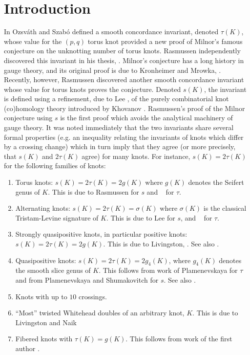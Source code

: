 \maketitle
\section{Introduction}





In \cite{FourBall} Ozsv{\'a}th and Szab{\'o} defined a smooth concordance invariant, denoted $\tau(K)$, whose value for the $(p,q)$ torus knot provided a new proof of Milnor's famous conjecture on the unknotting number of torus knots. Rasmussen independently discovered this invariant in his thesis, \cite{Ras1}. Milnor's conjecture has a long history in gauge theory, and its original proof is due to Kronheimer and Mrowka, \cite{KM}.  Recently, however, Rasmussen \cite{Ras2} discovered another smooth concordance invariant whose value for torus knots proves the conjecture.   Denoted $s(K)$, the invariant is defined using a refinement, due to Lee \cite{Lee}, of the purely combinatorial knot (co)homology  theory introduced by Khovanov \cite{Khovanov}.  Rasmussen's proof of the Milnor conjecture using $s$ is the first proof which avoids the analytical machinery of gauge theory.  It was noted immediately that the two invariants share several formal properties (e.g. an inequality relating the invariants of knots which differ by a crossing change) which in turn imply that they agree (or more precisely, that $s(K)$ and $2\tau(K)$ agree) for many knots.  For instance, $s(K)=2\tau(K)$ for the following families of knots:

\begin{enumerate}
	\item Torus knots:  $s(K)=2\tau(K)=2g(K)$ where $g(K)$ denotes the Seifert genus of $K$. This is due to Rasmussen \cite{Ras2}  for $s$ and \ons \ \cite{Lens} for $\tau$.  
	\item Alternating knots: $s(K)=2\tau(K)=\sigma(K)$ where $\sigma(K)$ is the classical Tristam-Levine signature of $K$. This is due to Lee \cite{Lee} for $s$, and \ons \ \cite{AltKnots} for $\tau$. 
	\item Strongly quasipositive knots, in particular positive knots: $s(K)=2\tau(K)=2g(K)$.  This is due to Livingston, \cite{Livingston1}.  See also \cite{Rudolph}.
	\item Quasipositive knots: $s(K)=2\tau(K)=2g_4(K)$, where $g_4(K)$ denotes the smooth slice genus of $K$. This follows from work of Plamenevskaya \cite{Olga1} for $\tau$ and from Plamenevskaya \cite{Olga2} and Shumakovitch \cite{Shumakovitch} for $s$. See also \cite{SQPfiber}.
	\item Knots with up to $10$ crossings.  \cite{Goda,Ras1,FourBall}
	\item ``Most'' twisted Whitehead doubles of an arbitrary knot, $K$.  This is due to Livingston and Naik \cite{Livingston2}
	\item Fibered knots with $\tau(K)=g(K)$. This follows from work of the first author \cite{SQPfiber}.
\end{enumerate}

